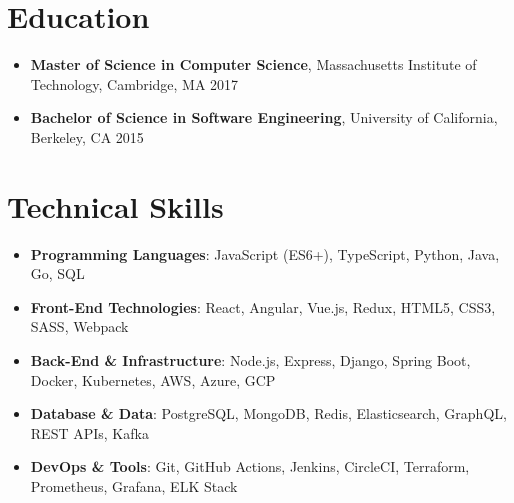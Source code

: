 \documentclass[a4paper,10pt]{article}
\begin{document}

\section*{Education}

\begin{itemize}
    \item {\bfseries Master of Science in Computer Science}, Massachusetts Institute of Technology, Cambridge, MA \hfill 2017
    
    \item {\bfseries Bachelor of Science in Software Engineering}, University of California, Berkeley, CA \hfill 2015
\end{itemize}

\section*{Technical Skills}

\begin{itemize}
    \item {\bfseries Programming Languages}: JavaScript (ES6+), TypeScript, Python, Java, Go, SQL
    
    \item {\bfseries Front-End Technologies}: React, Angular, Vue.js, Redux, HTML5, CSS3, SASS, Webpack
    
    \item {\bfseries Back-End \& Infrastructure}: Node.js, Express, Django, Spring Boot, Docker, Kubernetes, AWS, Azure, GCP
    
    \item {\bfseries Database \& Data}: PostgreSQL, MongoDB, Redis, Elasticsearch, GraphQL, REST APIs, Kafka
    
    \item {\bfseries DevOps \& Tools}: Git, GitHub Actions, Jenkins, CircleCI, Terraform, Prometheus, Grafana, ELK Stack
\end{itemize}
\end{document}

